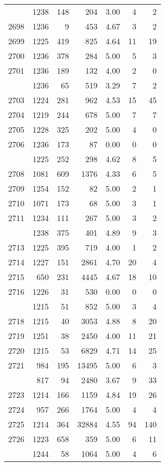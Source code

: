 \documentclass[
]{article}
\begin{document}
\begin{table}
\begin{tabular}[t]{lrrrrrr}
\addlinespace
2697 & 1238 & 148 & 204 & 3.00 & 4 & 2\\
2698 & 1236 & 9 & 453 & 4.67 & 3 & 2\\
2699 & 1225 & 419 & 825 & 4.64 & 11 & 19\\
2700 & 1236 & 378 & 284 & 5.00 & 5 & 3\\
2701 & 1236 & 189 & 132 & 4.00 & 2 & 0\\
\addlinespace
2702 & 1236 & 65 & 519 & 3.29 & 7 & 2\\
2703 & 1224 & 281 & 962 & 4.53 & 15 & 45\\
2704 & 1219 & 244 & 678 & 5.00 & 7 & 7\\
2705 & 1228 & 325 & 202 & 5.00 & 4 & 0\\
2706 & 1236 & 173 & 87 & 0.00 & 0 & 0\\
\addlinespace
2707 & 1225 & 252 & 298 & 4.62 & 8 & 5\\
2708 & 1081 & 609 & 1376 & 4.33 & 6 & 5\\
2709 & 1254 & 152 & 82 & 5.00 & 2 & 1\\
2710 & 1071 & 173 & 68 & 5.00 & 3 & 1\\
2711 & 1234 & 111 & 267 & 5.00 & 3 & 2\\
\addlinespace
2712 & 1238 & 375 & 401 & 4.89 & 9 & 3\\
2713 & 1225 & 395 & 719 & 4.00 & 1 & 2\\
2714 & 1227 & 151 & 2861 & 4.70 & 20 & 4\\
2715 & 650 & 231 & 4445 & 4.67 & 18 & 10\\
2716 & 1226 & 31 & 530 & 0.00 & 0 & 0\\
\addlinespace
2717 & 1215 & 51 & 852 & 5.00 & 3 & 4\\
2718 & 1215 & 40 & 3053 & 4.88 & 8 & 20\\
2719 & 1251 & 38 & 2450 & 4.00 & 11 & 21\\
2720 & 1215 & 53 & 6829 & 4.71 & 14 & 25\\
2721 & 984 & 195 & 13495 & 5.00 & 6 & 3\\
\addlinespace
2722 & 817 & 94 & 2480 & 3.67 & 9 & 33\\
2723 & 1214 & 166 & 1159 & 4.84 & 19 & 26\\
2724 & 957 & 266 & 1764 & 5.00 & 4 & 4\\
2725 & 1214 & 364 & 32884 & 4.55 & 94 & 140\\
2726 & 1223 & 658 & 359 & 5.00 & 6 & 11\\
\addlinespace
2727 & 1244 & 58 & 1064 & 5.00 & 4 & 6\\

\end{tabular}
\end{table}
\end{document}
